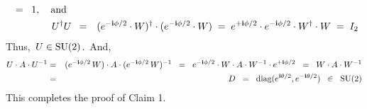 \begin{enumerate}
\begin{eqnarray*}
	\;\; = \;\;
		1,
	\quad\textnormal{and}\quad
	\\
	U^{\dagger}U{\color{white}2}
	& = &
		(e^{-\i\phi/2} \cdot W)^{\dagger} \cdot (e^{-\i\phi/2} \cdot W)
	\; = \;
		e^{+\i\phi/2} \cdot e^{-\i\phi/2} \cdot W^{\dagger} \cdot W
	\; = \;
		I_{2}
	\end{eqnarray*}
	Thus, \,$U \in \textnormal{SU}(2)$.\,
	And,
	\begin{eqnarray*}
	U \cdot A \cdot U^{-1}
	& = &
		(e^{-\textnormal{\bf i}\phi/2}\,W) \cdot A \cdot (e^{-\textnormal{\bf i}\phi/2}\,W)^{-1}
	\;\; = \;\;
		e^{-\textnormal{\bf i}\phi/2} \cdot W \cdot A \cdot W^{-1} \cdot e^{+\textnormal{\bf i}\phi/2}
	\;\; = \;\;
		W \cdot A \cdot W^{-1}
	\\
	& = &
		D
	\;\; = \;\;
		\textnormal{diag}(e^{\textnormal{\bf i}\theta/2},e^{-\textnormal{\bf i}\theta/2}) 
	\;\; \in \;\;
		\textnormal{SU}(2)
	\end{eqnarray*}
	This completes the proof of Claim 1.


\end{enumerate}
